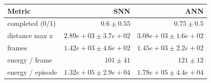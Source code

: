 \begin{tabular}{lrr}
\toprule
Metric & SNN & ANN \\
\midrule
completed (0/1) & $0.6 \pm 0.55$ & $0.75 \pm 0.5$ \\
distance max x & $2.89e+03 \pm 3.7e+02$ & $3.08e+03 \pm 1.6e+02$ \\
frames & $1.42e+03 \pm 4.6e+02$ & $1.45e+03 \pm 2.2e+02$ \\
energy / frame & $101 \pm 41$ & $121 \pm 12$ \\
energy / episode & $1.32e+05 \pm 2.9e+04$ & $1.78e+05 \pm 4.4e+04$ \\
\bottomrule
\end{tabular}
